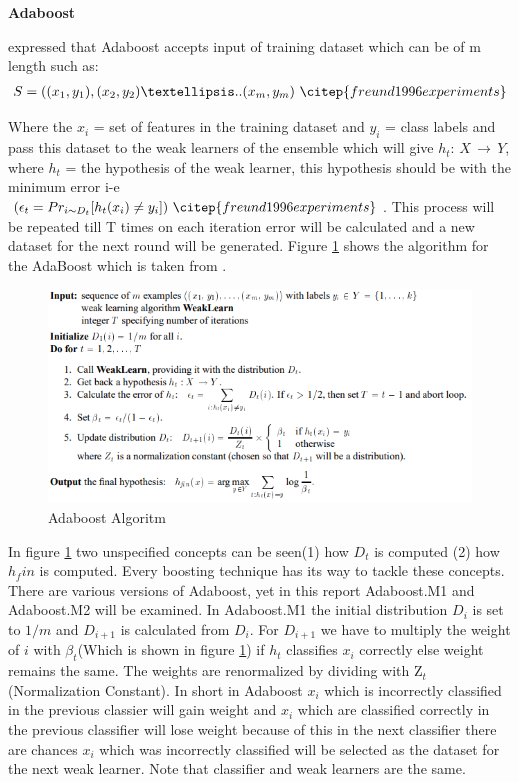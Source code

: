 \documentclass[12pt]{article}
\begin{document}
               
{\bf{Adaboost}}

\citep{freund1996experiments} expressed that Adaboost accepts input of training dataset which can be of m length such as:
	\begin{align*}
		S = ((x_1, y_1), (x_2, y_2) ….. (x_m, y_m) ~\citep{freund1996experiments}
	\end{align*}

Where the $x_i$ = set of features in the training dataset and $y_i$ = class labels and pass this dataset to the weak learners of the ensemble which will give $h_t$: $X\,\to\,Y$, where $h_t$ = the hypothesis of the weak learner, this hypothesis should be with the minimum error i-e \\ $(\epsilon_t = Pr_{i \sim D_t}[h_t(x_i)\neq  y_i])~\citep{freund1996experiments}$. This process will be repeated till T times on each iteration error will be calculated and a new dataset for the next round will be generated. Figure \ref{fig:Adaboost} shows the algorithm for the AdaBoost which is taken from \citep{freund1996experiments}. 
\begin{figure}[h!]
	\centering
	\includegraphics{Adaboost.png}
	\caption{Adaboost Algoritm ~\citep{freund1996experiments}}
	\label{fig:Adaboost}
\end{figure}
In figure \ref{fig:Adaboost} two unspecified concepts can be seen(1) how $D_t$ is computed (2) how $h_fin$ is computed. Every boosting technique has its way to tackle these concepts. There are various versions of Adaboost, yet in this report Adaboost.M1 and Adaboost.M2 will be examined. In Adaboost.M1 the initial distribution $D_i$ is set to $1/m$ and $D_{i+1}$ is calculated from $D_i$. For $D_{i+1}$ we have to multiply the weight of $i$ with $ \beta_t $(Which is shown in figure \ref{fig:Adaboost}) if $h_t$ classifies $x_i$ correctly else weight remains the same. The weights are renormalized by dividing with Z$_t$(Normalization Constant). In short in Adaboost $x_i$ which is incorrectly classified in the previous classier will gain weight and $x_i$ which are classified correctly in the previous classifier will lose weight because of this in the next classifier there are chances $x_i$ which was incorrectly classified will be selected as the dataset for the next weak learner. Note that classifier and weak learners are the same. 
\end{document}

